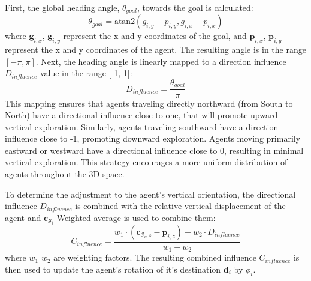         First, the global heading angle, $\theta_{goal}$, towards the goal is calculated: 
        \begin{equation}
            \theta_{goal} = \text{atan2}(g_{i,y} - p_{i,y}, g_{i,x} - p_{i,x})
        \end{equation}
        where $\mathbf{g}_{i, x}$, $\mathbf{g}_{i, y}$ represent the x and y coordinates of the goal, and $\mathbf{p}_{i, x}$, $\mathbf{p}_{i, y}$ represent the x and y coordinates of the agent.
        The resulting angle is in the range $[-\pi, \pi]$.
        Next, the heading angle is linearly mapped to a direction influence $D_{influence}$ value in the range [-1, 1]:
        \begin{equation}
            D_{influence} = \frac{\theta_{goal}}{\pi}
        \end{equation}
        This mapping ensures that agents traveling directly northward (from South to North) have a directional influence close to one, that will promote upward vertical exploration. 
        Similarly, agents traveling southward have a direction influence close to -1, promoting downward exploration. 
        Agents moving primarily eastward or westward have a directional influence close to 0, resulting in minimal vertical exploration.
        This strategy encourages a more uniform distribution of agents throughout the \ac{3D} space. 

        To determine the adjustment to the agent's vertical orientation, the directional influence $D_{influence}$ is combined with the relative vertical displacement of the agent and $\mathbf{c}_{\mathcal{S}_i}$
        Weighted average is used to combine them: 
        \begin{equation}
            \label{eqn:combined_influace}
            C_{influence} = \frac{w_1 \cdot (\mathbf{c}_{\mathcal{S}_i,z} - \mathbf{p}_{i,z}) + w_2 \cdot D_{influence}}{w_1 + w_2}
        \end{equation} 
        where $w_1$ $w_2$ are weighting factors. The resulting combined influence $C_{influence}$ is then used to update the agent's rotation of it's destination $\mathbf{d}_i$ by $\phi_i$.

